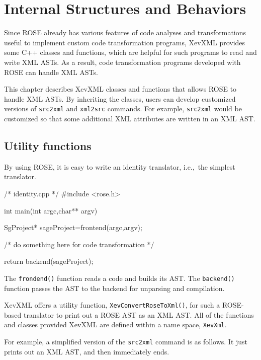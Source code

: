 \chapter{Internal Structures and Behaviors}\label{chap:internal}

Since ROSE already has various features of code analyses and
transformations useful to implement custom code transformation programs,
XevXML provides some C++ classes and functions, which are helpful for
such programs to read and write XML ASTs.  As a result, code
transformation programs developed with ROSE can handle XML ASTs.

This chapter describes XevXML classes and functions that allows ROSE to
handle XML ASTs. By inheriting the classes, users can develop customized
versions of \texttt{src2xml} and \texttt{xml2src} commands. For example,
\texttt{src2xml} would be customized so that some additional XML
attributes are written in an XML AST.


\section{Utility functions}

By using ROSE, it is easy to write an identity translator, i.e.,~the
simplest translator.
\begin{framed}
\begin{src}
/* identity.cpp */
#include <rose.h>

int main(int argc,char** argv){
  SgProject* sageProject=frontend(argc,argv);

  /* do something here for code transformation */

  return backend(sageProject);
}
\end{src}
\end{framed}

The \texttt{frondend()} function reads a code and builds its AST. The
\texttt{backend()} function passes the AST to the backend for unparsing
and compilation.

XevXML offers a utility function, \texttt{XevConvertRoseToXml()}, for
such a ROSE-based translator to print out a ROSE AST as an XML AST. All
of the functions and classes provided XevXML are defined within a name
space, \texttt{XevXml}.


For example, a simplified version of the \texttt{src2xml} command is as
follows. It just prints out an XML AST, and then immediately ends.

